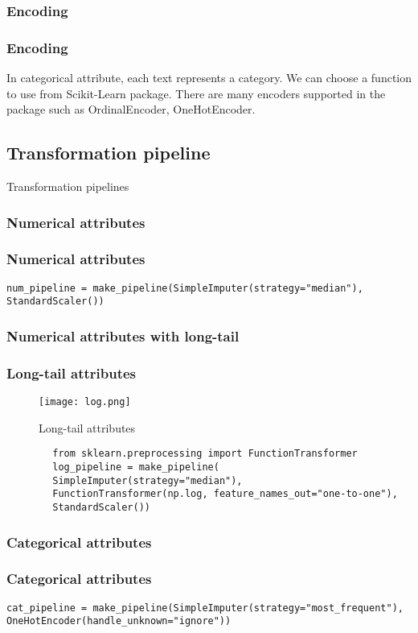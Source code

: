 \documentclass[10pt]{beamer}
\theoremstyle{definition}
\theoremstyle{remark}
\numberwithin{equation}{section}
\begin{document}
\subsubsection{Encoding}
\begin{frame}\frametitle{Encoding}
	In categorical attribute, each text represents a category. We can choose a function to use from Scikit-Learn package. There are many encoders supported in the package such as OrdinalEncoder, OneHotEncoder.
\end{frame}

\subsection{Transformation pipeline}
\begin{frame}
	\centering Transformation pipelines
\end{frame}
\subsubsection{Numerical attributes}
\begin{frame}[fragile]
	\frametitle{Numerical attributes}
\begin{lstlisting}
num_pipeline = make_pipeline(SimpleImputer(strategy="median"), StandardScaler())
\end{lstlisting}
\end{frame}
\subsubsection{Numerical attributes with long-tail}
\begin{frame}[fragile]
	\frametitle{Long-tail attributes}
	\begin{figure}[h]
		\caption{Long-tail attributes}
		\texttt{[image: log.png]}
	\end{figure}
	\begin{lstlisting}
		from sklearn.preprocessing import FunctionTransformer
		log_pipeline = make_pipeline(
		SimpleImputer(strategy="median"),
		FunctionTransformer(np.log, feature_names_out="one-to-one"),
		StandardScaler())		
	\end{lstlisting}
\end{frame}

\subsubsection{Categorical attributes}
\begin{frame}[fragile]
	\frametitle{Categorical attributes}

\begin{lstlisting}
cat_pipeline = make_pipeline(SimpleImputer(strategy="most_frequent"), OneHotEncoder(handle_unknown="ignore"))
\end{lstlisting}
\end{frame}
\end{document}
